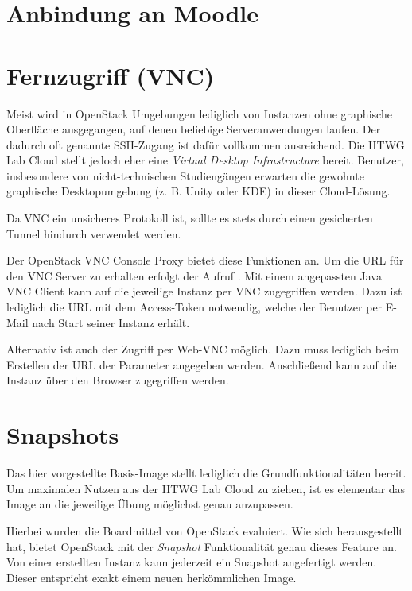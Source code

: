 \section{Anbindung an Moodle}


\section{Fernzugriff (VNC)}

Meist wird in OpenStack Umgebungen lediglich von Instanzen ohne graphische Oberfläche ausgegangen, auf denen beliebige Serveranwendungen laufen. 
Der dadurch oft genannte SSH-Zugang ist dafür vollkommen ausreichend.
Die HTWG Lab Cloud stellt jedoch eher eine \emph{Virtual Desktop Infrastructure} bereit.
Benutzer, insbesondere von nicht-technischen Studiengängen erwarten die gewohnte graphische Desktopumgebung (z. B. Unity oder KDE) in dieser Cloud-Lösung.

Da VNC ein unsicheres Protokoll ist, sollte es stets durch einen gesicherten Tunnel hindurch verwendet werden.

Der OpenStack VNC Console Proxy bietet diese Funktionen an.
Um die URL für den VNC Server zu erhalten erfolgt der Aufruf .
Mit einem angepassten Java VNC Client \cite{vncJava} kann auf die jeweilige Instanz per VNC zugegriffen werden. 
Dazu ist lediglich die URL mit dem Access-Token notwendig, welche der Benutzer per E-Mail nach Start seiner Instanz erhält.

Alternativ ist auch der Zugriff per Web-VNC möglich. 
Dazu muss lediglich beim Erstellen der URL der Parameter  angegeben werden. 
Anschließend kann auf die Instanz über den Browser zugegriffen werden.

\section{Snapshots}

Das hier vorgestellte Basis-Image stellt lediglich die Grundfunktionalitäten bereit. 
Um maximalen Nutzen aus der HTWG Lab Cloud zu ziehen, ist es elementar das Image an die jeweilige Übung möglichst genau anzupassen.

Hierbei wurden die Boardmittel von OpenStack evaluiert.
Wie sich herausgestellt hat, bietet OpenStack mit der \emph{Snapshot} Funktionalität genau dieses Feature an.
Von einer erstellten Instanz kann jederzeit ein Snapshot angefertigt werden.
Dieser entspricht exakt einem neuen herkömmlichen Image.

